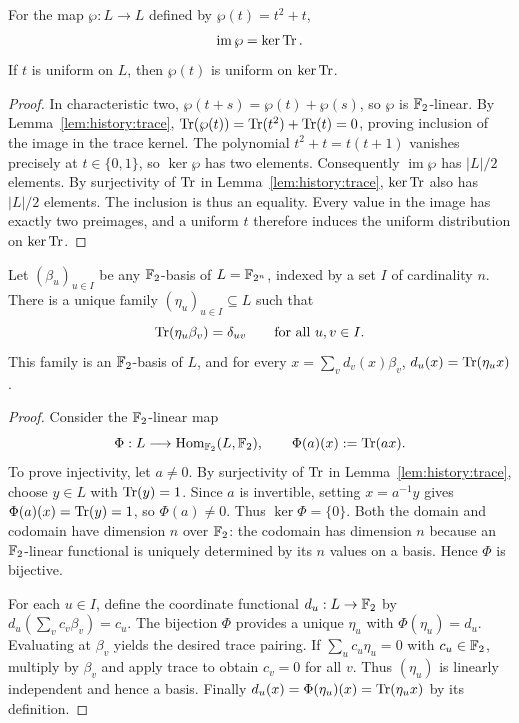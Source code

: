 \begin{lemma}\label{lem:history:artinschreier}
For the map $\wp:L\to L$ defined by $\wp(t)=t^2+t$,
\[
 \operatorname{im}\wp=\ker\operatorname{Tr}.
\]
If $t$ is uniform on $L$, then $\wp(t)$ is uniform on $\ker\operatorname{Tr}$.
\end{lemma}
\begin{proof}
In characteristic two, $\wp(t+s)=\wp(t)+\wp(s)$, so $\wp$ is $\mathbb{F}_2$-linear. By Lemma~\ref{lem:history:trace},
$\operatorname{Tr}(\wp(t))=\operatorname{Tr}(t^2)+\operatorname{Tr}(t)=0$, proving inclusion of the image in the trace kernel. The polynomial $t^2+t=t(t+1)$ vanishes precisely at $t\in\{0,1\}$, so $\ker\wp$ has two elements. Consequently $\operatorname{im}\wp$ has $|L|/2$ elements. By surjectivity of $\operatorname{Tr}$ in Lemma~\ref{lem:history:trace}, $\ker\operatorname{Tr}$ also has $|L|/2$ elements. The inclusion is thus an equality. Every value in the image has exactly two preimages, and a uniform $t$ therefore induces the uniform distribution on $\ker\operatorname{Tr}$.
\end{proof}

\begin{lemma}\label{lem:history:dualbasis}
Let $(\beta_u)_{u\in I}$ be any $\mathbb{F}_2$-basis of $L=\mathbb{F}_{2^n}$, indexed by a set $I$ of cardinality $n$. There is a unique family $(\eta_u)_{u\in I}\subseteq L$ such that
\[
 \operatorname{Tr}(\eta_u\beta_v)=\delta_{uv}
 \qquad\text{for all }u,v\in I.
\]
This family is an $\mathbb{F}_2$-basis of $L$, and for every $x=\sum_v d_v(x)\beta_v$,
$d_u(x)=\operatorname{Tr}(\eta_ux)$.
\end{lemma}
\begin{proof}
Consider the $\mathbb{F}_2$-linear map
\[
 \Phi:L\longrightarrow\operatorname{Hom}_{\mathbb{F}_2}(L,\mathbb{F}_2),\qquad
 \Phi(a)(x):=\operatorname{Tr}(ax).
\]
To prove injectivity, let $a\neq0$. By surjectivity of $\operatorname{Tr}$ in Lemma~\ref{lem:history:trace}, choose $y\in L$ with $\operatorname{Tr}(y)=1$. Since $a$ is invertible, setting $x=a^{-1}y$ gives $\Phi(a)(x)=\operatorname{Tr}(y)=1$, so $\Phi(a)\neq0$. Thus $\ker\Phi=\{0\}$. Both the domain and codomain have dimension $n$ over $\mathbb{F}_2$: the codomain has dimension $n$ because an $\mathbb{F}_2$-linear functional is uniquely determined by its $n$ values on a basis. Hence $\Phi$ is bijective.

For each $u\in I$, define the coordinate functional $d_u:L\to\mathbb{F}_2$ by $d_u(\sum_vc_v\beta_v)=c_u$. The bijection $\Phi$ provides a unique $\eta_u$ with $\Phi(\eta_u)=d_u$. Evaluating at $\beta_v$ yields the desired trace pairing. If $\sum_uc_u\eta_u=0$ with $c_u\in\mathbb{F}_2$, multiply by $\beta_v$ and apply trace to obtain $c_v=0$ for all $v$. Thus $(\eta_u)$ is linearly independent and hence a basis. Finally $d_u(x)=\Phi(\eta_u)(x)=\operatorname{Tr}(\eta_ux)$ by its definition.
\end{proof}

